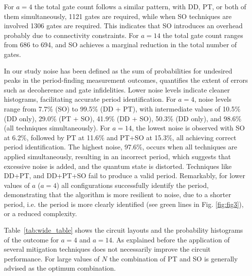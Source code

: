 \documentclass[conference,twoside]{IEEEtran}
\begin{document}
For $a=4$ the total gate count follows a similar pattern, with DD, PT, or both of them simultaneously, 1121 gates are required, while when SO techniques are involved 1306 gates are required. This indicates that SO introduces an overhead probably due to connectivity constraints. For $a=14$ the total gate count ranges from 686 to 694, and SO achieves a marginal reduction in the total number of gates.

In our study noise has been defined as the sum of probabilities for undesired peaks in the period-finding measurement outcomes, quantifies the extent of errors such as decoherence and gate infidelities. Lower noise levels indicate cleaner histograms, facilitating accurate period identification. For $a=4$, noise levels range from 7.7\% (SO) to 99.5\% (DD + PT), with intermediate values of 10.5\% (DD only), 29.0\% (PT + SO), 41.9\% (DD + SO), 50.3\% (DD only), and 98.6\% (all techniques simultaneously). For $a=14$, the lowest noise is observed with SO at 6.2\%, followed by PT at 11.6\% and PT+SO at 15.3\%, all achieving correct period identification. The highest noise, 97.6\%, occurs when all techniques are applied simultaneously, resulting in an incorrect period, which suggests that excessive noise is added, and the quantum state is distorted. Techniques like DD+PT, and DD+PT+SO fail to produce a valid period. Remarkably, for lower values of $a$ ($a=4$) all configurations successfully identify the period, demonstrating that the algorithm is more resilient to noise, due to a shorter period, i.e. the period is more clearly identified (see green lines in Fig. \ref{fig:fig3}), or a reduced complexity.

 Table~\ref{tab:wide_table} shows the circuit layouts and the probability histograms of the outcome for $a=4$ and $a=14$. As explained before the application of several mitigation techniques does not necessarily improve the circuit performance. For large values of $N$  the combination of PT and SO is generally advised as the optimum combination.
\end{document}
